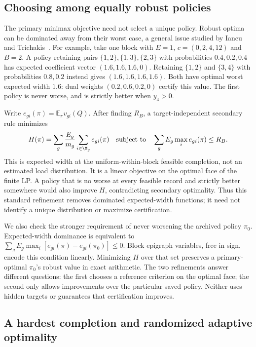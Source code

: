 \subsection{Choosing among equally robust policies}\label{sec:tie-selection}
The primary minimax objective need not select a unique policy. Robust
optima can be dominated away from their worst case, a general issue studied
by Iancu and Trichakis~\citep{iancu2014}. For example, take one block with
$E=1$, $c=(0,2,4,12)$ and $B=2$. A policy retaining pairs
$\{1,2\},\{1,3\},\{2,3\}$ with probabilities $0.4,0.2,0.4$ has expected
coefficient vector $(1.6,1.6,1.6,0)$. Retaining $\{1,2\}$ and $\{3,4\}$
with probabilities $0.8,0.2$ instead gives $(1.6,1.6,1.6,1.6)$.
Both have optimal worst expected width $1.6$: dual weights
$(0.2,0.6,0.2,0)$ certify this value. The first policy is never worse,
and is strictly better when $y_4>0$.

Write $e_{gi}(\pi)=\mathbb E_\pi v_{gi}(Q)$. After finding $R_B$, a
target-independent secondary rule minimizes
\begin{equation}
 H(\pi)=\sum_g\frac{E_g}{m_g}\sum_{i\in\M_g} e_{gi}(\pi)
 \quad\text{subject to}\quad
 \sum_g E_g\max_i e_{gi}(\pi)\leq R_B.
 \label{eq:secondary-policy}
\end{equation}
This is expected width at the uniform-within-block feasible completion,
not an estimated load distribution. It is a linear objective on the
optimal face of the finite LP. A policy that is no worse at every feasible
record and strictly better somewhere would also improve $H$, contradicting
secondary optimality. Thus this standard refinement removes dominated
expected-width functions; it need not identify a unique distribution or
maximize certification.

We also check the stronger requirement of never worsening the archived
policy $\pi_0$. Expected-width dominance is equivalent to
$\sum_g E_g\max_i[e_{gi}(\pi)-e_{gi}(\pi_0)]\leq0$.
Block epigraph variables, free in sign, encode this condition linearly.
Minimizing $H$ over that set preserves a primary-optimal $\pi_0$'s robust
value in exact arithmetic. The two refinements answer different questions:
the first chooses a reference criterion on the optimal face; the second
only allows improvements over the particular saved policy. Neither uses
hidden targets or guarantees that certification improves.

\subsection{A hardest completion and randomized adaptive optimality}
\label{sec:adaptive-dual-completion}

